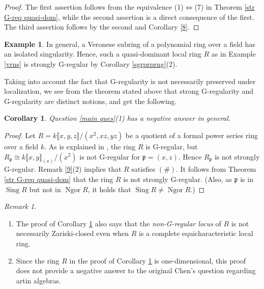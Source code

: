\documentclass{amsart}
\newtheorem{cor}[thm]{Corollary}
\theoremstyle{definition}
\newtheorem{eg}[thm]{Example}
\theoremstyle{remark}
\newtheorem{rem}[thm]{Remark}
\numberwithin{equation}{thm}
\def\ng{\operatorname{Ngor}}
\def\p{\mathfrak{p}}
\def\sing{\operatorname{Sing}}
\begin{document}
\begin{proof}
The first assertion follows from the equivalence (1)$\Leftrightarrow$(7) in Theorem \ref{str G-req quasi-dom}, while the second assertion is a direct consequence of the first.
The third assertion follows by the second and Corollary \ref{8}.
\end{proof}

\begin{eg}\label{str G-reg rem2}
In general, a Veronese subring of a polynomial ring over a field has an isolated singularity.
Hence, such a quasi-dominant local ring $R$ as in Example \ref{vrns} is strongly G-regular by Corollary \ref{sgrprprng}(2).
\end{eg}

Taking into account the fact that G-regularity is not necessarily preserved under localization, we see from the theorem stated above that strong G-regularity and G-regularity are distinct notions, and get the following.

\begin{cor}\label{11}
Question \ref{main ques}(1) has a negative answer in general.
\end{cor}

\begin{proof}
Let $R=k\llbracket x,y,z\rrbracket/(x^2, xz, yz)$ be a quotient of a formal power series ring over a field $k$.
As is explained in \cite[Example 6.2]{T08}, the ring $R$ is G-regular, but $R_\p\cong k\llbracket x,y\rrbracket_{(x)}/(x^2)$ is not G-regular for $\p=(x,z)$.
Hence $R_\p$ is not strongly G-regular.
Remark \ref{9}(2) implies that $R$ satisfies $(\#)$.
It follows from Theorem \ref{str G-req quasi-dom} that the ring $R$ is not strongly G-regular.
(Also, as $\p$ is in $\sing R$ but not in $\ng R$, it holds that $\sing R\ne\ng R$.)
\end{proof}

\begin{rem}
\begin{enumerate}[(1)]
\item
The proof of Corollary \ref{11} also says that the {\em non-G-regular locus} of $R$ is not necessarily Zariski-closed even when $R$ is a complete equicharacteristic local ring.
\item
Since the ring $R$ in the proof of Corollary \ref{11} is one-dimensional, this proof does not provide a negative answer to the original Chen's question \cite[Problem C]{Che17} regarding artin algebras.
\end{enumerate}
\end{rem}
\end{document}
